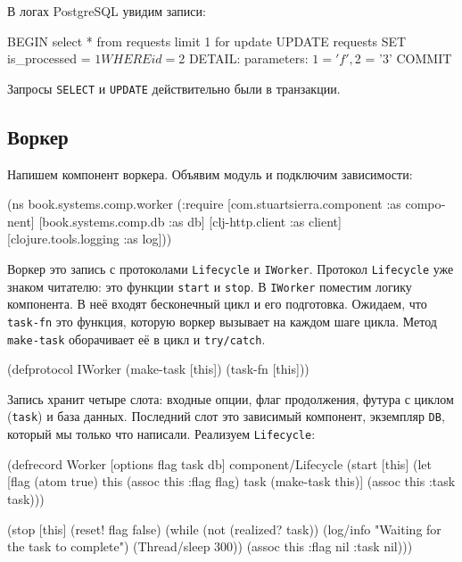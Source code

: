 \noindent
В логах PostgreSQL увидим записи:


\begin{english}
  \begin{sql}
BEGIN
select * from requests limit 1 for update
UPDATE requests SET is_processed = $1 WHERE id = $2
DETAIL:  parameters: $1 = 'f', $2 = '3'
COMMIT
  \end{sql}
\end{english}

\noindent
Запросы \verb|SELECT| и \verb|UPDATE| действительно были в транзакции.

\subsection{Воркер}

Напишем компонент воркера. Объявим модуль и подключим зависимости:

\begin{english}
  \begin{clojure}
(ns book.systems.comp.worker
  (:require
   [com.stuartsierra.component :as component]
   [book.systems.comp.db :as db]
   [clj-http.client :as client]
   [clojure.tools.logging :as log]))
  \end{clojure}
\end{english}


Воркер это запись с протоколами \verb|Lifecycle| и \verb|IWorker|. Протокол
\verb|Lifecycle| уже знаком читателю: это функции \verb|start| и
\verb|stop|. В \verb|IWorker| поместим логику компонента. В неё входят
бесконечный цикл и его подготовка. Ожидаем, что \verb|task-fn| это функция,
которую воркер вызывает на каждом шаге цикла. Метод \verb|make-task|
оборачивает её в цикл и \verb|try/catch|.

\begin{english}
  \begin{clojure}
(defprotocol IWorker
  (make-task [this])
  (task-fn [this]))
  \end{clojure}
\end{english}

Запись хранит четыре слота: входные опции, флаг продолжения, футура с циклом
(\verb|task|) и база данных. Последний слот это зависимый компонент, экземпляр
\verb|DB|, который мы только что написали. Реализуем \verb|Lifecycle|:

\begin{english}
  \begin{clojure/lines}
(defrecord Worker
  [options flag task db]
  component/Lifecycle
  (start [this]
    (let [flag (atom true)
          this (assoc this :flag flag)
          task (make-task this)]
      (assoc this :task task)))

  (stop [this]
    (reset! flag false)
    (while (not (realized? task))
      (log/info "Waiting for the task to complete")
      (Thread/sleep 300))
    (assoc this :flag nil :task nil)))
  \end{clojure/lines}
\end{english}

